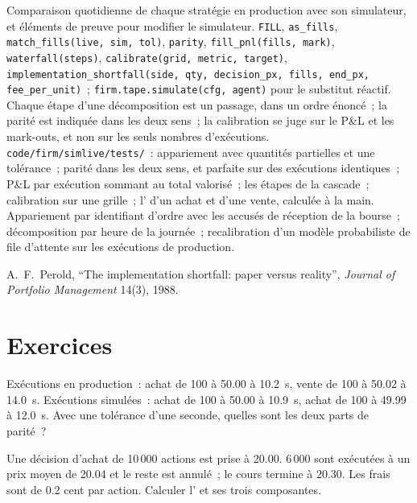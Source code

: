\begin{build}
 Comparaison quotidienne de chaque stratégie en production avec son simulateur, et éléments de preuve pour modifier le simulateur.
 \texttt{FILL}, \texttt{as\_fills}, \texttt{match\_fills(live, sim, tol)}, \texttt{parity}, \texttt{fill\_pnl(fills, mark)}, \texttt{waterfall(steps)},
\texttt{calibrate(grid, metric, target)}, \texttt{implementation\_shortfall(side, qty, decision\_px, fills, end\_px, fee\_per\_unit)}~; \texttt{firm.tape.simulate(cfg,
agent)} pour le substitut réactif.
 Chaque étape d'une décomposition est un passage, dans un ordre énoncé~; la parité est indiquée dans les deux sens~; la calibration se juge sur le P\&L et les mark-outs, et non sur les seuls nombres d'exécutions.
 \texttt{code/firm/simlive/tests/}~: appariement avec quantités partielles et une tolérance~; parité dans les deux sens, et parfaite sur des exécutions identiques~; P\&L par exécution
sommant au total valorisé~; les étapes de la cascade~; calibration sur une grille~; l' d'un achat et d'une vente, calculée à la main.
 Appariement par identifiant d'ordre avec les accusés de réception de la bourse~; décomposition par heure de la journée~; recalibration d'un modèle probabiliste de file d'attente sur les exécutions de production.
\end{build}

\begin{omsources}
\item A.~F.~Perold, ``The implementation shortfall: paper versus reality'', \emph{Journal of Portfolio Management} 14(3), 1988.
\end{omsources}

\section{Exercices}

\begin{exercise}[$\star$]\label{exo:rs:simulation-versus-live:1}
Exécutions en production~: achat de 100 à 50.00 à 10.2~s, vente de 100 à 50.02 à 14.0~s. Exécutions simulées~: achat de 100 à 50.00 à 10.9~s, achat de 100 à 49.99 à 12.0~s. Avec une
tolérance d'une seconde, quelles sont les deux parts de parité~?
\end{exercise}

\begin{exercise}[$\star$]\label{exo:rs:simulation-versus-live:2}
Une décision d'achat de 10\,000 actions est prise à 20.00. 6\,000 sont exécutées à un prix moyen de 20.04 et le reste est annulé~; le cours termine à 20.30. Les frais sont de 0.2 cent par action.
Calculer l' et ses trois composantes.
\end{exercise}


